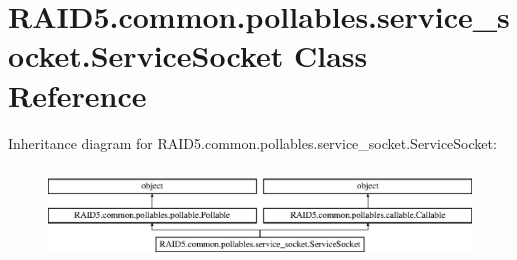 \hypertarget{class_r_a_i_d5_1_1common_1_1pollables_1_1service__socket_1_1_service_socket}{}\section{R\+A\+I\+D5.\+common.\+pollables.\+service\+\_\+socket.\+Service\+Socket Class Reference}
\label{class_r_a_i_d5_1_1common_1_1pollables_1_1service__socket_1_1_service_socket}
Inheritance diagram for R\+A\+I\+D5.\+common.\+pollables.\+service\+\_\+socket.\+Service\+Socket\+:\begin{figure}[H]
\begin{center}
\leavevmode
\includegraphics[height=2.507463cm]{class_r_a_i_d5_1_1common_1_1pollables_1_1service__socket_1_1_service_socket}
\end{center}
\end{figure}
